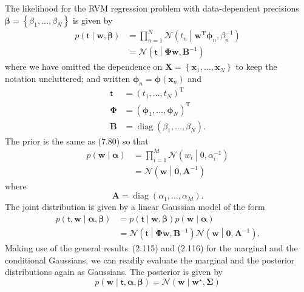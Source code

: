 \documentclass[12pt,a4paper]{article}
\begin{document}
The likelihood for the RVM regression problem with
data-dependent precisions~$\bm{\beta} = \left\{ \beta_1, \dots, \beta_N \right\}$ is given by
\begin{align}
p \left( \bm{\mathsf{t}} \middle| \mathbf{w}, \bm{\beta} \right)
&= \prod_{n=1}^{N}
\mathcal{N} \left( t_n \middle| \mathbf{w}^{\operatorname{T}} \bm{\phi}_n, \beta_n^{-1} \right) \\
&= \mathcal{N} \left( \bm{\mathsf{t}} \middle| \bm{\Phi}\mathbf{w}, \mathbf{B}^{-1} \right)
\end{align}
where we have omitted the dependence on
$\mathbf{X} = \left\{ \mathbf{x}_1, \dots, \mathbf{x}_N \right\}$
to keep the notation uncluttered;
and written $\bm{\phi}_n = \bm{\phi} \left(\mathbf{x}_n\right)$ and
\begin{align}
\bm{\mathsf{t}} &= \left( t_1, \dots, t_N \right)^{\operatorname{T}} \\
\bm{\Phi} &= \left( \bm{\phi}_1, \dots, \bm{\phi}_N \right)^{\operatorname{T}} \\
\mathbf{B} &= \operatorname{diag} \left( \beta_1, \dots, \beta_N \right) .
\end{align}
The prior is the same as (7.80) so that
\begin{align}
p \left( \mathbf{w} \middle| \bm{\alpha} \right)
&= \prod_{i = 1}^{M} \mathcal{N} \left( w_i \middle| 0, \alpha_i^{-1} \right) \\
&= \mathcal{N} \left( \mathbf{w} \middle| \mathbf{0}, \mathbf{A}^{-1} \right)
\end{align}
where
\begin{equation}
\mathbf{A} = \operatorname{diag} \left( \alpha_1, \dots, \alpha_M \right) .
\end{equation}
The joint distribution is given by a linear Gaussian model of the form
\begin{align}
p \left( \bm{\mathsf{t}}, \mathbf{w} \middle| \bm{\alpha}, \bm{\beta} \right)
&= p \left( \bm{\mathsf{t}} \middle| \mathbf{w}, \bm{\beta} \right)
p \left( \mathbf{w} \middle| \bm{\alpha} \right) \\
&= \mathcal{N} \left( \bm{\mathsf{t}} \middle| \bm{\Phi}\mathbf{w}, \mathbf{B}^{-1} \right)
\mathcal{N} \left( \mathbf{w} \middle| \mathbf{0}, \mathbf{A}^{-1} \right) .
\end{align}
Making use of the general results~(2.115) and (2.116) for
the marginal and the conditional Gaussians,
we can readily evaluate the marginal and the posterior distributions again as Gaussians.
The posterior is given by
\begin{equation}
p \left( \mathbf{w} \middle| \bm{\mathsf{t}}, \bm{\alpha}, \bm{\beta} \right)
= \mathcal{N} \left( \mathbf{w} \middle| \mathbf{w}^{\star}, \bm{\Sigma} \right)
\end{equation}
\end{document}
